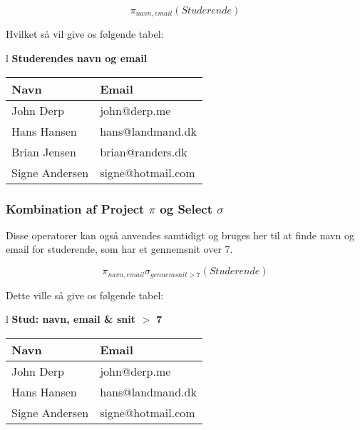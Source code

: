\begin{equation}
\pi_{navn, email}(Studerende)
\end{equation}

Hvilket så vil give os følgende tabel:

\begin{center}
	\begin{tabular}{l}\label{tab:stud}
		\textbf{\large Studerendes navn og email}	\\
		\begin{tabular}{|l|l|}		
			\hline
			\textbf{Navn}&\textbf{Email}\\
			\hline
			John Derp		&  john@derp.me		\\
			\hline
			Hans Hansen		&  hans@landmand.dk		\\
			\hline
			Brian Jensen	&  brian@randers.dk		\\
			\hline
			Signe Andersen	& signe@hotmail.com		\\
			\hline
		\end{tabular}
	\end{tabular}
\end{center}

\subsubsection{Kombination af Project $\pi$ og Select $\sigma$}

Disse operatorer kan også anvendes samtidigt og bruges her til at finde navn og email for studerende, som har et gennemsnit over 7.

\begin{equation}
\pi_{navn, email}\sigma_{gennemsnit>7}(Studerende)
\end{equation}

Dette ville så give os følgende tabel:

\begin{center}
	\begin{tabular}{l}\label{tab:stud}
		\textbf{\large Stud: navn, email \& snit $>$ 7}	\\
		\begin{tabular}{|l|l|}		
			\hline
			\textbf{Navn}&\textbf{Email}\\
			\hline
			John Derp		&  john@derp.me		\\
			\hline
			Hans Hansen		&  hans@landmand.dk		\\
			\hline
			Signe Andersen	& signe@hotmail.com		\\
			\hline
		\end{tabular}
	\end{tabular}
\end{center}





















